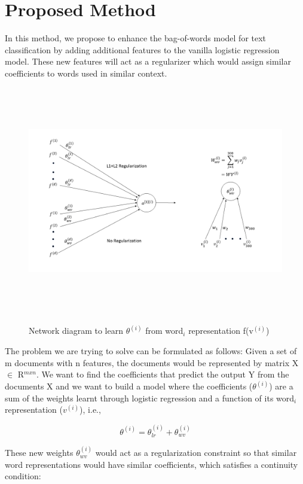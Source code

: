 \newpage
\chapter{Proposed Method}

In this method, we propose to enhance the bag-of-words model for text classification by adding additional features to the vanilla logistic regression model. These new features will act as a regularizer which would assign similar coefficients to words used in similar context.

\begin{figure}[htbp]
\centering
\includegraphics[width=16cm, height=10cm]{images/proposed_method.png}\\
\centering
\caption{Network diagram to learn $\theta^{(i)}$ from word$_{i}$ representation f(v$^{(i)}$)}
\label{fig:foo}
\end{figure}

The problem we are trying to solve can be formulated as follows: Given a set of m documents with n features, the documents would be represented by matrix X $\in$ R$^{m x n}$. We want to find the coefficients that predict the output Y from the documents X and we want to build a model where the coefficients ($\theta^{(i)}$) are a sum of the weights learnt through logistic regression and a function of its word$_{i}$ representation ($v^{(i)}$), i.e.,

\begin{equation}\label{lb1}
\theta^{(i)} = \theta_{lr}^{(i)} + \theta_{wv}^{(i)}
\end{equation}

These new weights $\theta_{wv}^{(i)}$ would act as a regularization constraint so that similar word representations would have similar coefficients, which satisfies a continuity condition:

